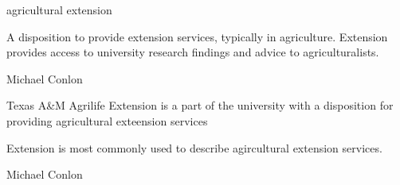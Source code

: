 \documentclass[letterpaper,10pt,english]{sphinxmanual}
\begin{document}
\begin{sphinxShadowBox}

\sphinxAtStartPar
agricultural extension
\end{sphinxShadowBox}

\begin{sphinxShadowBox}

\sphinxAtStartPar
A disposition to provide extension services, typically in agriculture.  Extension provides access to university research findings and advice to agriculturalists.
\end{sphinxShadowBox}

\begin{sphinxShadowBox}

\sphinxAtStartPar
Michael Conlon 
\end{sphinxShadowBox}

\begin{sphinxShadowBox}

\sphinxAtStartPar
Texas A\&M Agrilife Extension is a part of the university with a disposition for providing agricultural exteension services
\end{sphinxShadowBox}

\begin{sphinxShadowBox}

\sphinxAtStartPar
Extension is most commonly used to describe agircultural extension services.
\end{sphinxShadowBox}

\begin{sphinxShadowBox}

\sphinxAtStartPar
Michael Conlon 
\end{sphinxShadowBox}
\begin{quote}
\label{\detokenize{doc-ORG_0000013:org-0000013}}\label{\detokenize{doc-ORG_0000013:technology-transfer-disposition}}\label{\detokenize{doc-ORG_0000013:org-0000013}}
\ignorespaces \end{quote}
\end{document}
